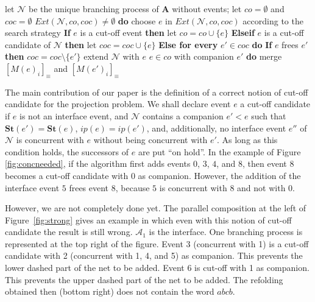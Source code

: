 \documentclass{llncs}
\def\A{\mathcal{A}}
\def\prod{\mathbf{A}}
\def\N{\mathcal{N}}
\def\co{co}
\def\tco{coc}
\newcommand{\st}[1]{\mathbf{St}(#1)}
\begin{document}
\begin{algorithm}[htbp]
\begin{algorithmic}
\State let $\N$ be the unique branching process of $\prod$ without events; let $\co=\emptyset$ and $\tco=\emptyset$
 $Ext(\N,\co,\tco)\neq\emptyset$ {\bf do}
\State\hspace*{0.4cm} choose $e$ in $Ext(\N,\co,\tco)$ according to the search strategy
\State\hspace*{0.4cm} {\bf If} $e$ is a cut-off event {\bf then} let $\co=\co\cup\{e\}$
\State\hspace*{0.4cm} {\bf Elseif} $e$ is a cut-off candidate of $\N$ {\bf then} let $\tco=\tco\cup\{e\}$
\State\hspace*{0.4cm} {\bf Else for every} $e' \in \tco$ {\bf do}
\State\hspace*{0.8cm} {\bf If} $e$ frees $e'$ {\bf then} $\tco=\tco\setminus \{e'\}$
\State\hspace*{0.4cm} extend $\N$ with $e$
 $e \in \co$ with companion $e'$ {\bf do} merge $[M(e)_i]_\equiv$ and $[M(e')_i]_\equiv$
\end{algorithmic}
\caption{Unfolding procedure for a product $\prod$.}
\label{algo:unfolding2}
\end{algorithm}

The main contribution of our paper is the definition of a correct notion of cut-off candidate for the projection problem. 
We shall declare event $e$ a  cut-off candidate if $e$ is not an interface event,
and $\N$ contains a companion $e' < e$ such that $\st{e'} = \st{e}$, $ip(e)=ip(e')$, and, additionally, no interface event $e''$ of $\N$ is concurrent with $e$ without being concurrent with $e'$.
As long as this condition holds, the successors of $e$ are put ``on hold''. In the example of Figure \ref{fig:concneeded}, if the algorithm first adds events $0$, $3$, $4$, and $8$, then event $8$ becomes a cut-off candidate with $0$ as companion. However, the addition of the interface event $5$ frees event $8$, because $5$ is concurrent with $8$ and not with $0$.

However, we are not completely done yet. 
The parallel composition at the left of Figure~\ref{fig:strong} gives an example in which 
even with this notion of cut-off candidate the result is still wrong.
$\A_1$ is the interface.
One branching process is represented at the top right of the figure. 
Event 3 (concurrent with 1) is a cut-off candidate with 2 (concurrent with 1, 4, and 5) as companion.
This prevents the lower dashed part of the net to be added.
Event 6 is cut-off with 1 as companion.
This prevents the upper dashed part of the net to be added.
The refolding obtained then (bottom right) does not contain the word $abcb$.
\end{document}
